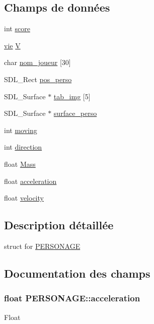 \subsection*{Champs de données}
\begin{DoxyCompactItemize}
\item 
int \hyperlink{structPERSONAGE_aceab7ab293b56197a8dc153b1aaa2d9e}{score}
\item 
\hyperlink{structvie}{vie} \hyperlink{structPERSONAGE_a55ff47547f25a0a9df67118b91ea58e1}{V}
\item 
char \hyperlink{structPERSONAGE_a6427edb6392463410ad168649b33e410}{nom\+\_\+joueur} \mbox{[}30\mbox{]}
\item 
S\+D\+L\+\_\+\+Rect \hyperlink{structPERSONAGE_a251556a634db6d532af5f928b8a0abe4}{pos\+\_\+perso}
\item 
S\+D\+L\+\_\+\+Surface $\ast$ \hyperlink{structPERSONAGE_a51061ec01fedcce4c8562e043d81cd7a}{tab\+\_\+img} \mbox{[}5\mbox{]}
\item 
S\+D\+L\+\_\+\+Surface $\ast$ \hyperlink{structPERSONAGE_a26a39d344c1ec5d424198c24538f73dc}{surface\+\_\+perso}
\item 
int \hyperlink{structPERSONAGE_a48bc0c626e0210e735c49ba6df5d13e6}{moving}
\item 
int \hyperlink{structPERSONAGE_a1a098d28a8c9867a93df293d4f6731fb}{direction}
\item 
float \hyperlink{structPERSONAGE_aa23d53bb20cc721798d1400f5e121af9}{Mass}
\item 
float \hyperlink{structPERSONAGE_ab3ccb046bb255a27d60b07e2b4df9672}{acceleration}
\item 
float \hyperlink{structPERSONAGE_aaf4734e2f426e60eef271207bc0d3b3d}{velocity}
\end{DoxyCompactItemize}


\subsection{Description détaillée}
struct for \hyperlink{structPERSONAGE}{P\+E\+R\+S\+O\+N\+A\+GE} 

\subsection{Documentation des champs}
\subsubsection[{\texorpdfstring{acceleration}{acceleration}}]{\setlength{\rightskip}{0pt plus 5cm}float P\+E\+R\+S\+O\+N\+A\+G\+E\+::acceleration}\hypertarget{structPERSONAGE_ab3ccb046bb255a27d60b07e2b4df9672}{}\label{structPERSONAGE_ab3ccb046bb255a27d60b07e2b4df9672}
Float 
